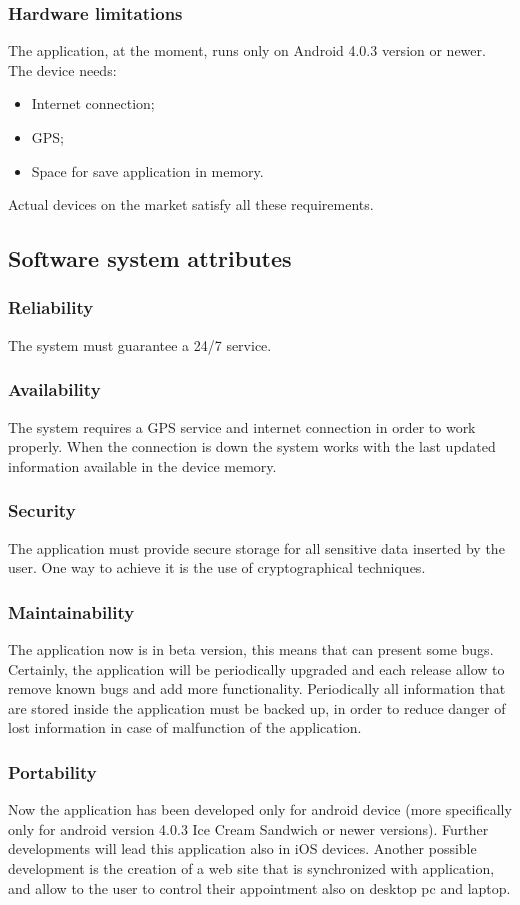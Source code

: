 \subsubsection{Hardware limitations}
The application, at the moment, runs only on Android 4.0.3 version or newer. \\
The device needs:
\begin{itemize}
	\item Internet connection;
	\item GPS;
	\item Space for save application in memory.
\end{itemize}
Actual devices on the market satisfy all these requirements.
\subsection{Software system attributes}
\subsubsection{Reliability}
The system must guarantee a 24/7 service.
\subsubsection{Availability}
The system requires a GPS service and internet connection in order to work properly. When the connection is down the system works with the last updated information available in the device memory. 
\subsubsection{Security}
The application must provide secure storage for all sensitive data inserted by the user. One way to achieve it is the use of cryptographical techniques.
\subsubsection{Maintainability}
The application now is in beta version, this means that can present some bugs. Certainly, the application will be periodically upgraded and each release allow to remove known bugs and add more functionality.
Periodically all information that are stored inside the application must be backed up, in order to reduce danger of lost information in case of malfunction of the application.
\subsubsection{Portability}
Now the application has been developed only for android device (more specifically only for android version 4.0.3 Ice Cream Sandwich or newer versions).
Further developments will lead this application also in iOS devices.
Another possible development is the creation of a web site that is synchronized with application, and allow to the user to control their appointment also on desktop pc and laptop.
